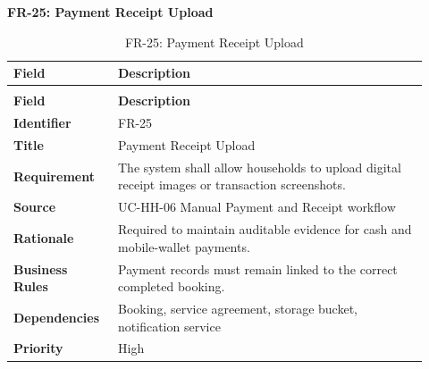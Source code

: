 \documentclass[12pt,a4paper]{article}
\begin{document}
\noindent\textbf{FR-25: Payment Receipt Upload}\par
\vspace{4pt}
\begingroup\small\setlength{\tabcolsep}{4pt}\renewcommand{\arraystretch}{1.15}
\begin{longtable}{|>{\raggedright\arraybackslash}p{0.22\linewidth}|>{\raggedright\arraybackslash}p{0.70\linewidth}|}
\caption{FR-25: Payment Receipt Upload}\label{tab:fr-25}\\
\hline
\textbf{Field} & \textbf{Description} \\ \hline
\endfirsthead
\multicolumn{2}{c}{Table \thetable\ Payment Receipt Upload (continued)}\\
\hline
\textbf{Field} & \textbf{Description} \\ \hline
\endhead
\textbf{Identifier} & FR-25 \\ \hline
\textbf{Title} & Payment Receipt Upload \\ \hline
\textbf{Requirement} & The system shall allow households to upload digital receipt images or transaction screenshots. \\ \hline
\textbf{Source} & UC-HH-06 Manual Payment and Receipt workflow \\ \hline
\textbf{Rationale} & Required to maintain auditable evidence for cash and mobile-wallet payments. \\ \hline
\textbf{Business Rules} & Payment records must remain linked to the correct completed booking. \\ \hline
\textbf{Dependencies} & Booking, service agreement, storage bucket, notification service \\ \hline
\textbf{Priority} & High \\ \hline
\end{longtable}
\endgroup
\end{document}
